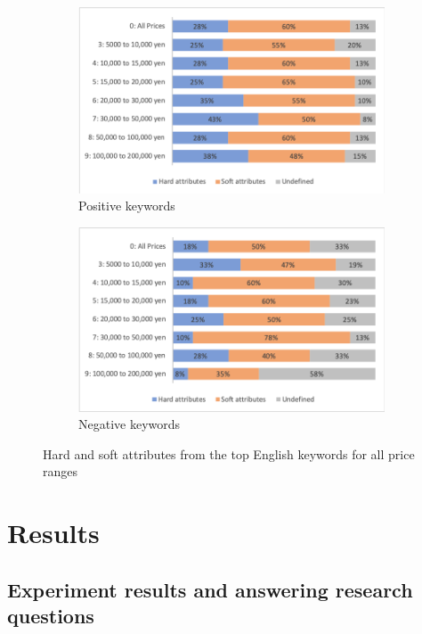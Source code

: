 \documentclass[smallextended,natbib]{svjour3}       %
\begin{document}
  \begin{figure}[ht]
      \centering
      \begin{subfigure}[b]{0.45\textwidth}
          \includegraphics[width=\textwidth]{hard_soft_attr_en_pos.png}
          \caption{Positive keywords}
      \end{subfigure}
      \begin{subfigure}[b]{0.45\textwidth}
          \includegraphics[width=\textwidth]{hard_soft_attr_en_neg.png}
          \caption{Negative keywords}
      \end{subfigure}
  \caption{Hard and soft attributes from the top English keywords for all price ranges}
  \label{fig:hard_soft_en}
  \end{figure}


\section{Results}\label{results}

  \subsection{Experiment results and answering research questions}
\end{document}
